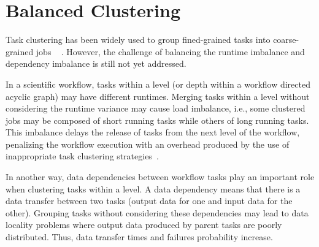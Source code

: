 \section{Balanced Clustering}
\label{sec:imbalance}


Task clustering has been widely used to group fined-grained tasks into coarse-grained jobs ~\cite{Muthuvelu:2005:DJG:1082290.1082297, 4493929, Muthuvelu2010, Muthuvelu2013170, keat-2006, ang-2009, 4958835, Silva2013} . However, the challenge of balancing the runtime imbalance and dependency imbalance is still not yet addressed.

In a scientific workflow, tasks within a level (or depth within a workflow directed acyclic graph) may have different runtimes. Merging tasks within a level without considering the runtime variance may cause load imbalance, i.e., some clustered jobs may be composed of short running tasks while others of long running tasks. This imbalance delays the release of tasks from the next level of the workflow, penalizing the workflow execution with an overhead produced by the use of inappropriate task clustering strategies~\cite{Chen2013}.


In another way, data dependencies between workflow tasks play an important role when clustering tasks within a level. A data dependency means that there is a data transfer between two tasks (output data for one and input data for the other). Grouping tasks without considering these dependencies may lead to data locality problems where output data produced by parent tasks are poorly distributed. Thus, data transfer times and failures probability increase.

